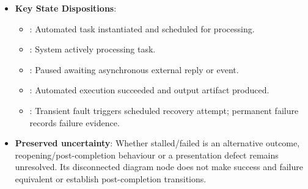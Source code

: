 \begin{itemize}

\item
\textbf{Key State Dispositions}:


\begin{itemize}

\item
\texttt{}: Automated task instantiated and scheduled for processing.



\item
\texttt{}: System actively processing task.



\item
\texttt{}: Paused awaiting asynchronous external reply or event.



\item
\texttt{}: Automated execution succeeded and output artifact produced.



\item
\texttt{}: Transient fault triggers scheduled recovery attempt; permanent failure records failure evidence.



\end{itemize}


\item
\textbf{Preserved uncertainty}: Whether stalled/\allowbreak{}failed is an alternative outcome, reopening/\allowbreak{}post-completion behaviour or a presentation defect remains unresolved. Its disconnected diagram node does not make success and failure equivalent or establish post-completion transitions.



\end{itemize}

\par\smallskip




